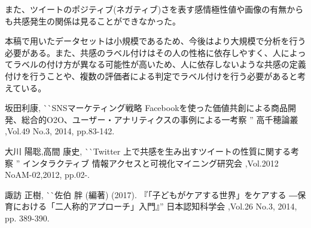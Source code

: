 \documentclass[dvipdfmx]{issj}
\begin{document}
また、ツイートのポジティブ(ネガティブ)さを表す感情極性値や画像の有無からも共感発生の関係は見ることができなかった。

本稿で用いたデータセットは小規模であるため、今後はより大規模で分析を行う必要がある。また、共感のラベル付けはその人の性格に依存しやすく、人によってラベルの付け方が異なる可能性が高いため、人に依存しないような共感の定義付けを行うことや、複数の評価者による判定でラベル付けを行う必要があると考えている。





\begin{thebibliography}{99}


   坂田利康, 
                       ^^ ^^ SNSマーケティング戦略 Facebookを使った価値共創による商品開発、総合的O2O、ユーザー・アナリティクスの事例による一考察 '' 
                       高千穂論叢 ,Vol.49 No.3, 2014, pp.83-142.

    大川 陽聡,高間 康史, 
                       ^^ ^^ Twitter 上で共感を生み出すツイートの性質に関する考察 '' 
                       インタラクティブ 情報アクセスと可視化マイニング研究会 ,Vol.2012 NoAM-02,2012, pp.02-.



   諏訪 正樹,
                       ^^ ^^ 佐伯 胖 (編著) (2017). 『「子どもがケアする世界」をケアする ―保育における「二人称的アプローチ」入門』'' 
                       日本認知科学会 ,Vol.26 No.3, 2014, pp. 389-390.


\end{thebibliography}
\end{document}
